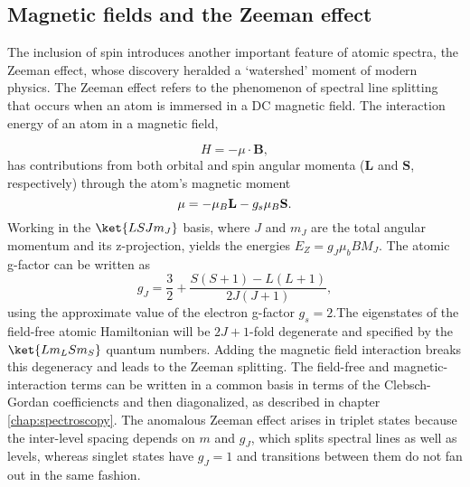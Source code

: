 	

	
	

\subsection*{Magnetic fields and the Zeeman effect}

	The inclusion of spin introduces another important feature of atomic spectra, the Zeeman effect, whose discovery heralded a `watershed' moment of modern physics.
	The Zeeman effect refers to the phenomenon of spectral line splitting that occurs when an atom is immersed in a DC magnetic field.
	The interaction energy of an atom in a magnetic field, 
	
	\begin{equation}
		H = -\mu\cdot \textbf{B},
	\end{equation}
	has contributions from both orbital and spin angular momenta ($\textbf{L}$ and $\textbf{S}$, respectively) through the atom's magnetic moment 
	\begin{equation}
		{\bf \mu} = -\mu_B\textbf{L} - g_s\mu_B \textbf{S}.
	\end{equation}
	Working in the $\ket{LSJm_J}$ basis, where $J$ and $m_J$ are the total angular momentum and its z-projection, yields the energies $E_Z = g_J \mu_b B M_J$.
	The atomic g-factor can be written as
	\begin{equation}
		g_J = \frac{3}{2} + \frac{S(S+1)-L(L+1)}{2J(J+1)},
	\end{equation}
	using the approximate value of the electron g-factor $g_s=2$.The eigenstates of the field-free atomic Hamiltonian will be $2J+1$-fold degenerate and specified by the $\ket{Lm_L S m_S}$ quantum numbers.
	Adding the magnetic field interaction breaks this degeneracy and leads to the Zeeman splitting.
	The field-free and magnetic-interaction terms can be written in a common basis in terms of the Clebsch-Gordan coefficiencts and then diagonalized, as described in chapter \ref{chap:spectroscopy}.
	The anomalous Zeeman effect arises in triplet states because the inter-level spacing depends on $m$ and $g_J$, which splits spectral lines as well as levels, whereas singlet states have $g_J=1$ and transitions between them do not fan out in the same fashion.
	
